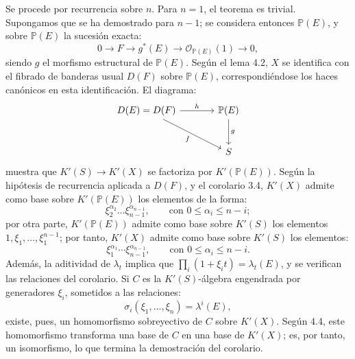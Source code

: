 Se procede por recurrencia sobre \(n\). Para \(n=1\), el teorema es trivial. Supongamos que se ha demostrado para \(n-1\); se considera entonces \(\mathbb P(E)\), y sobre \(\mathbb P(E)\) la sucesión exacta:
\[
  0\longrightarrow F\longrightarrow g^*(E)\longrightarrow \mathcal O_{\mathbb P(E)}(1)\longrightarrow 0,
\]
siendo \(g\) el morfismo estructural de \(\mathbb P(E)\). Según el lema 4.2, \(X\) se identifica con el fibrado de banderas usual \(D(F)\) sobre \(\mathbb P(E)\), correspondiéndose los haces canónicos en esta identificación. El diagrama:
\[
\begin{tikzcd}[column sep=large,row sep=large]
D(E)=D(F) \arrow[r,"h"] \arrow[dr,"f"'] & \mathbb P(E) \arrow[d,"g"]\\
& S
\end{tikzcd}
\]
muestra que \(K'(S)\to K'(X)\) se factoriza por \(K'(\mathbb P(E))\). Según la hipótesis de recurrencia aplicada a \(D(F)\), y el corolario 3.4, \(K'(X)\) admite como base sobre \(K'(\mathbb P(E))\) los elementos de la forma:
\[
  \xi_2^{\alpha_2}\ldots\xi_{n-1}^{\alpha_{n-1}},
  \qquad \text{con } 0\le\alpha_i\le n-i;
\]
por otra parte, \(K'(\mathbb P(E))\) admite como base sobre \(K'(S)\) los elementos \(1,\xi_1,\ldots,\xi_1^{n-1}\); por tanto, \(K'(X)\) admite como base sobre \(K'(S)\) los elementos:
\[
  \xi_1^{\alpha_1}\cdots\xi_{n-1}^{\alpha_{n-1}},
  \qquad \text{con } 0\le\alpha_i\le n-i.
\]
Además, la aditividad de \(\lambda_t\) implica que \(\prod_i(1+\xi_i t)=\lambda_t(E)\), y se verifican las relaciones del corolario. Si \(C\) es la \(K'(S)\)-álgebra engendrada por generadores \(\xi_i\), sometidos a las relaciones:
\[
  \sigma_i(\xi_1,\ldots,\xi_n)=\lambda^i(E),
\]
existe, pues, un homomorfismo sobreyectivo de \(C\) sobre \(K'(X)\). Según 4.4, este homomorfismo transforma una base de \(C\) en una base de \(K'(X)\); es, por tanto, un isomorfismo, lo que termina la demostración del corolario.

